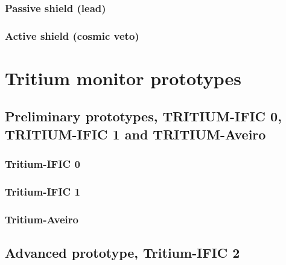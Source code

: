 \documentclass[12pt,a4paper]{book}
\begin{document}
	\subsection{Passive shield (lead)}
	 \label{subsec:CharacterizationPassiveShield}
					
	\subsection{Active shield (cosmic veto)} %
	\label{subsec:CharacterizationActiveShield}

\chapter{Tritium monitor prototypes}\label{chap:Prototypes}	
	
	\section[Preliminary prototypes]{Preliminary prototypes, TRITIUM-IFIC 0, TRITIUM-IFIC 1 and TRITIUM-Aveiro}\label{sec:Preliminary_prototypes}
		\subsection{Tritium-IFIC 0}
		
		\subsection{Tritium-IFIC 1}
		
		\subsection{Tritium-Aveiro}
		\newpage
		
	\section[Tritium-IFIC 2]{Advanced prototype, Tritium-IFIC 2}
	\newpage
		
\end{document}
